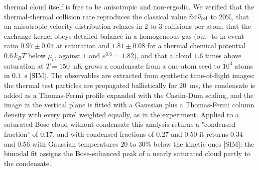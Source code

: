 thermal cloud itself is free to be anisotropic and non-ergodic. We verified
that the thermal-thermal collision rate reproduces the classical value
$\bar n\sigma\bar v_{\rm rel}$ to $20\%$, that an anisotropic velocity
distribution relaxes in $2$ to $3$ collisions per atom, that the exchange
kernel obeys detailed balance in a homogeneous gas (out- to in-event ratio
$0.97\pm0.04$ at saturation and $1.81\pm0.08$ for a thermal chemical
potential $0.6\,k_BT$ below $\mu_c$, against $1$ and $e^{0.6}=1.82$), and
that a cloud $1.6$ times above saturation at $T=150$~nK grows a condensate
from a one-atom seed to $10^3$ atoms in $0.1$~s [SIM]. The observables are
extracted from synthetic time-of-flight images: the thermal test particles
are propagated ballistically for $20$~ms, the condensate is added as a
Thomas-Fermi profile expanded with the Castin-Dum scaling, and the image in
the vertical plane is fitted with a Gaussian plus a Thomas-Fermi column
density with every pixel weighted equally, as in the experiment. Applied to
a saturated Bose cloud without condensate this analysis returns a
"condensed fraction" of $0.17$, and with condensed fractions of $0.27$ and
$0.50$ it returns $0.34$ and $0.56$ with Gaussian temperatures $20$ to $30\%$
below the kinetic ones [SIM]: the bimodal fit assigns the Bose-enhanced peak
of a nearly saturated cloud partly to the condensate.

